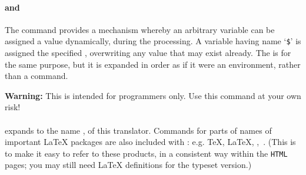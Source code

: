 %
%
\paragraph*{\texttt{}%
\texttt{} and 
\texttt{}%
\texttt{}\label{HTMLset}}
The  command provides a mechanism whereby an arbitrary
\Perl{} variable can be assigned a value dynamically, during the \latextohtml{} processing. 
A variable having name `\texttt{\$}' is assigned the specified ,
overwriting any value that may exist already. The  is for the same purpose,
but it is expanded in order as if it were an environment, rather than a command.

\medskip\noindent
\textbf{Warning: }This is intended for \Perl{} programmers only.
Use this command at your own risk!

\htmlrule[width=300]
%
%
%
\paragraph*{\label{l2hname}} 
expands to the name \latextohtml, of this translator.
Commands for parts of names of important \LaTeX{} packages are also 
included with \latextohtml: e.g. \TeX, \LaTeX, \AmS, \Xy\,.
(This is to make it easy to refer to these products, in a consistent way
within the \texttt{HTML} pages; you may still need \LaTeX{} definitions
for the typeset version.)

\medskip



